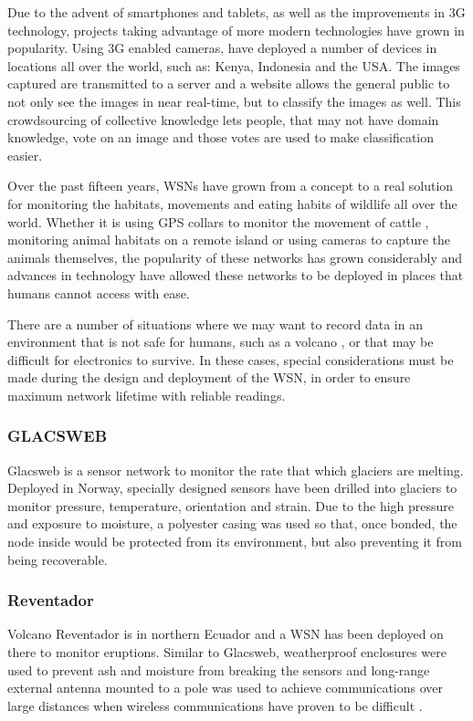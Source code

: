 	Due to the advent of smartphones and tablets, as well as the improvements in 3G technology, projects taking advantage of more modern technologies have grown in popularity. Using 3G enabled cameras, \cite{ZSL} have deployed a number of devices in locations all over the world, such as: Kenya, Indonesia and the USA. The images captured are transmitted to a server and a website allows the general public to not only see the images in near real-time, but to classify the images as well. This crowdsourcing of collective knowledge lets people, that may not have domain knowledge, vote on an image and those votes are used to make classification easier.

	Over the past fifteen years, WSNs have grown from a concept to a real solution for monitoring the habitats, movements and eating habits of wildlife all over the world. Whether it is using GPS collars to monitor the movement of cattle \cite{Guo2006}, monitoring animal habitats on a remote island or using cameras to capture the animals themselves, the popularity of these networks has grown considerably and advances in technology have allowed these networks to be deployed in places that humans cannot access with ease.
	
		There are a number of situations where we may want to record data in an environment that is not safe for humans, such as a volcano \cite{Werner-Allen2006}, or that may be difficult for electronics to survive. In these cases, special considerations must be made during the design and deployment of the WSN, in order to ensure maximum  network lifetime with reliable readings.
	\subsubsection{GLACSWEB}
	Glacsweb is a sensor network to monitor the rate that which glaciers are melting. Deployed in Norway, specially designed sensors have been drilled into glaciers to monitor pressure, temperature, orientation and strain. Due to the high pressure and exposure to moisture, a polyester casing was used so that, once bonded, the node inside would be protected from its environment, but also preventing it from being recoverable.
	\subsubsection{Reventador}
	Volcano Reventador is in northern Ecuador and a WSN has been deployed on there to monitor eruptions. Similar to Glacsweb, weatherproof enclosures were used to prevent ash and moisture from breaking the sensors and long-range external antenna mounted to a pole was used to achieve communications over large distances when wireless communications have proven to be difficult \cite{Werner-Allen2006}.
